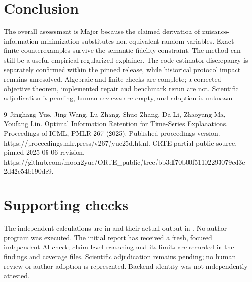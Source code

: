 \documentclass[10pt]{article}
\begin{document}
\section*{Conclusion}
The overall assessment is Major because the claimed derivation of nuisance-information minimization substitutes non-equivalent random variables. Exact finite counterexamples survive the semantic fidelity constraint. The method can still be a useful empirical regularized explainer. The code estimator discrepancy is separately confirmed within the pinned release, while historical protocol impact remains unresolved. Algebraic and finite checks are complete; a corrected objective theorem, implemented repair and benchmark rerun are not. Scientific adjudication is pending, human reviews are empty, and adoption is unknown.\par
9 Jinghang Yue, Jing Wang, Lu Zhang, Shuo Zhang, Da Li, Zhaoyang Ma, Youfang Lin. Optimal Information Retention for Time-Series Explanations. Proceedings of ICML, PMLR 267 (2025). Published proceedings version. https://proceedings.mlr.press/v267/yue25d.html. ORTE partial public source, pinned 2025-06-06 revision. https://github.com/moon2yue/ORTE\_public/tree/bb3df70b00f51102293079cd3e2d42c54b190de9.\par
\section*{Supporting checks}
The independent calculations are in and their actual output in . No author program was executed. The initial report has received a fresh, focused independent AI check; claim-level reasoning and its limits are recorded in the findings and coverage files. Scientific adjudication remains pending; no human review or author adoption is represented. Backend identity was not independently attested.\par
\end{document}
